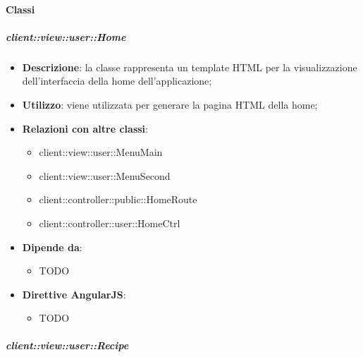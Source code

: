	\paragraph{Classi} %
		\subparagraph{client::view::user::Home} %
		\label{subp:bdsm_app_client_view_user_home}

			\begin{itemize}
				\item \textbf{Descrizione}: la classe rappresenta un template HTML per la visualizzazione dell'interfaccia della home dell'applicazione;
				\item \textbf{Utilizzo}: viene utilizzata per generare la pagina HTML della home;
				\item \textbf{Relazioni con altre classi}:
					\begin{itemize}
						\item client::view::user::MenuMain
						\item client::view::user::MenuSecond
						\item client::controller::public::HomeRoute
						\item client::controller::user::HomeCtrl
					\end{itemize}
				\item \textbf{Dipende da}:
					\begin{itemize}
						\item TODO
					\end{itemize}
				\item \textbf{Direttive AngularJS}:
					\begin{itemize}
						\item TODO
					\end{itemize}
			\end{itemize}

		\subparagraph{client::view::user::Recipe} %
		\label{subp:bdsm_app_client_view_user_recipe}


